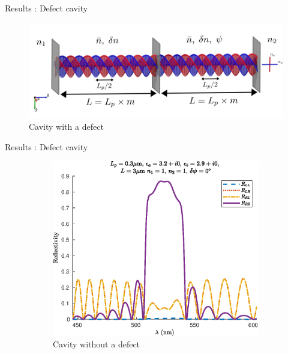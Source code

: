 \documentclass[aspectratio=169]{beamer}
\begin{document}
\begin{frame}{Results : Defect cavity}
	\begin{figure}
		\centering
		\includegraphics[width=\linewidth]{images/defect.png}
		\caption{Cavity with a defect}
	\end{figure}
\end{frame}
\begin{frame}{Results : Defect cavity}
	\begin{figure}
		\begin{subfigure}{0.32\textwidth}
			\centering
			\includegraphics[width=\linewidth]{plots/defect/no_defect/oseen_reflection}
			\caption{Cavity without a defect}
		\end{subfigure}
		\begin{subfigure}{0.32\textwidth}
			\centering

\end{subfigure}
\end{figure}
\end{frame}
\end{document}
